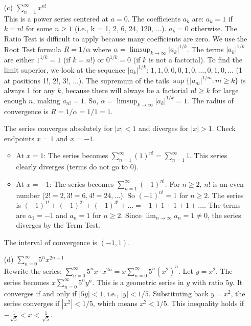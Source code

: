 \documentclass{article}
\begin{document}
\begin{enumerate}
  \item[(c)] \(\sum_{n=1}^\infty x^{n!}\) \\
    This is a power series centered at \(a=0\). The coefficients \(a_k\) are:
    \(a_k = 1\) if \(k = n!\) for some \(n \ge 1\) (i.e., k = 1, 2, 6, 24, 120, ...).
    \(a_k = 0\) otherwise.
    The Ratio Test is difficult to apply because many coefficients are zero. We use the Root Test formula \(R = 1/\alpha\) where \(\alpha = \limsup_{k\to\infty} |a_k|^{1/k}\).
    The terms \(|a_k|^{1/k}\) are either \(1^{1/k} = 1\) (if \(k=n!\)) or \(0^{1/k} = 0\) (if \(k\) is not a factorial).
    To find the limit superior, we look at the sequence \(|a_k|^{1/k}\): \(1, 1, 0, 0, 0, 1, 0, \ldots, 0, 1, 0, \ldots\) (1 at positions 1!, 2!, 3!, ...).
    The supremum of the tails \(\sup \{|a_m|^{1/m} : m \ge k\}\) is always 1 for any \(k\), because there will always be a factorial \(n! \ge k\) for large enough \(n\), making \(a_{n!} = 1\).
    So, \(\alpha = \limsup_{k\to\infty} |a_k|^{1/k} = 1\).
    The radius of convergence is \(R = 1/\alpha = 1/1 = 1\).

    The series converges absolutely for \(|x| < 1\) and diverges for \(|x| > 1\).
    Check endpoints \(x = 1\) and \(x = -1\).
    \begin{itemize}
        \item At \(x = 1\): The series becomes \(\sum_{n=1}^\infty (1)^{n!} = \sum_{n=1}^\infty 1\). This series clearly diverges (terms do not go to 0).
        \item At \(x = -1\): The series becomes \(\sum_{n=1}^\infty (-1)^{n!}\). For \(n \ge 2\), \(n!\) is an even number (\(2!=2, 3!=6, 4!=24, \dots\)). So \( (-1)^{n!} = 1\) for \(n \ge 2\). The series is \((-1)^{1!} + (-1)^{2!} + (-1)^{3!} + \dots = -1 + 1 + 1 + 1 + \dots\). The terms are \(a_1 = -1\) and \(a_n = 1\) for \(n \ge 2\). Since \(\lim_{n\to\infty} a_n = 1 \ne 0\), the series diverges by the Term Test.
    \end{itemize}
    The interval of convergence is \((-1, 1)\).

  \item[(d)] \(\sum_{n=0}^\infty 5^n x^{2n+1}\) \\
    Rewrite the series: \(\sum_{n=0}^\infty 5^n x \cdot x^{2n} = x \sum_{n=0}^\infty 5^n (x^2)^n\).
    Let \(y = x^2\). The series becomes \(x \sum_{n=0}^\infty 5^n y^n\).
    This is a geometric series in \(y\) with ratio \(5y\). It converges if and only if \(|5y| < 1\), i.e., \(|y| < 1/5\).
    Substituting back \(y = x^2\), the series converges if \(|x^2| < 1/5\), which means \(x^2 < 1/5\).
    This inequality holds if \(-\frac{1}{\sqrt{5}} < x < \frac{1}{\sqrt{5}}\).


\end{enumerate}
\end{document}
